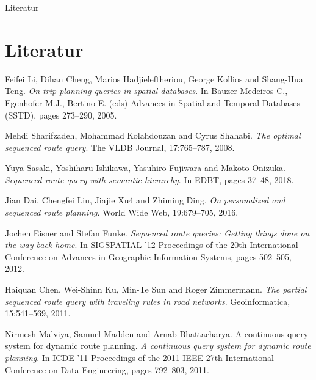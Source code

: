 \documentclass[18pt]{beamer}
\begin{document}
\appendix

\begin{frame}[allowframebreaks]{Literatur}

	
	
	\section{Literatur}
	\begin{thebibliography}{9}
		
		Feifei Li, Dihan Cheng, Marios Hadjieleftheriou, George Kollios and Shang-Hua Teng.
		\textit{On trip planning queries in spatial databases}. 
		In Bauzer Medeiros C., Egenhofer M.J., Bertino E. (eds) Advances in Spatial and Temporal Databases (SSTD), pages 273–290, 2005.
		
		Mehdi Sharifzadeh, Mohammad Kolahdouzan and Cyrus Shahabi.
		\textit{The optimal sequenced route query}. 
		The VLDB Journal, 17:765–787, 2008.
		
		Yuya Sasaki, Yoshiharu Ishikawa, Yasuhiro Fujiwara and Makoto Onizuka.
		\textit{Sequenced route query with semantic hierarchy}. 
		In EDBT, pages 37–48, 2018.
		
		Jian Dai, Chengfei Liu, Jiajie Xu4 and Zhiming Ding.
		\textit{On personalized and sequenced route planning}. 
		World Wide Web, 19:679–705, 2016.
		
		Jochen Eisner and Stefan Funke.
		\textit{Sequenced route queries: Getting things done on the way back home}. 
		In SIGSPATIAL ’12 Proceedings of the 20th International Conference on Advances in Geographic Information Systems, pages 502–505, 2012.
		
		Haiquan Chen, Wei-Shinn Ku, Min-Te Sun and Roger Zimmermann.
		\textit{The partial sequenced route query with traveling rules in road networks}. 
		Geoinformatica, 15:541–569, 2011.
		
		Nirmesh Malviya, Samuel Madden and Arnab Bhattacharya. A continuous query system for dynamic route planning.
		\textit{A continuous query system for dynamic route planning}. 
		In ICDE ’11 Proceedings of the 2011 IEEE 27th International Conference on Data Engineering, pages 792–803, 2011.
		
	\end{thebibliography}
\end{frame}
\end{document}
